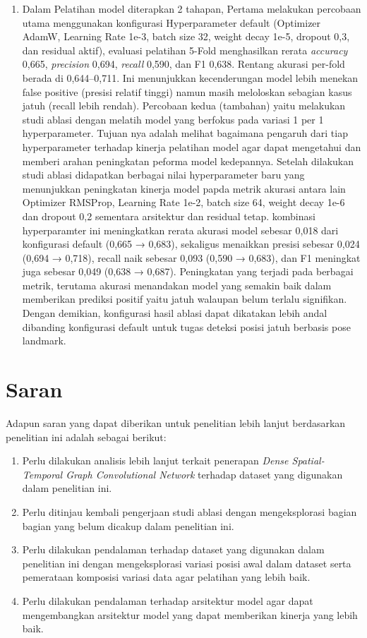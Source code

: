 \begin{enumerate}
    \item Dalam Pelatihan model diterapkan 2 tahapan, Pertama melakukan percobaan utama menggunakan konfigurasi Hyperparameter default (Optimizer AdamW, Learning Rate 1e-3, batch size 32, weight decay 1e-5, dropout 0,3, dan residual aktif), evaluasi pelatihan 5-Fold menghasilkan rerata \textit{accuracy} 0,665, \textit{precision} 0,694, \textit{recall} 0,590, dan F1 0,638. Rentang akurasi per-fold berada di 0,644–0,711. Ini menunjukkan kecenderungan model lebih menekan false positive (presisi relatif tinggi) namun masih meloloskan sebagian kasus jatuh (recall lebih rendah). Percobaan kedua (tambahan) yaitu melakukan studi ablasi dengan melatih model yang berfokus pada variasi 1 per 1 hyperparameter. Tujuan nya adalah melihat bagaimana pengaruh dari tiap hyperparameter terhadap kinerja pelatihan model agar dapat mengetahui dan memberi arahan peningkatan peforma model kedepannya. Setelah dilakukan studi ablasi didapatkan berbagai nilai hyperparameter baru yang menunjukkan peningkatan kinerja model papda metrik akurasi antara lain Optimizer RMSProp, Learning Rate 1e-2, batch size 64, weight decay 1e-6 dan dropout 0,2 sementara arsitektur dan residual tetap. kombinasi hyperparamter ini meningkatkan rerata akurasi model sebesar 0,018 dari konfigurasi default (0,665 → 0,683), sekaligus menaikkan presisi sebesar 0,024 (0,694 → 0,718), recall naik sebesar 0,093 (0,590 → 0,683), dan F1 meningkat juga sebesar 0,049 (0,638 → 0,687). Peningkatan yang terjadi pada berbagai metrik, terutama akurasi menandakan model yang semakin baik dalam memberikan prediksi positif yaitu jatuh walaupan belum terlalu signifikan. Dengan demikian, konfigurasi hasil ablasi dapat dikatakan lebih andal dibanding konfigurasi default untuk tugas deteksi posisi jatuh berbasis pose landmark.
\end{enumerate}


\section{Saran} \label{V.Saran}
Adapun saran yang dapat diberikan untuk penelitian lebih lanjut berdasarkan penelitian ini adalah sebagai berikut:\par
\begin{enumerate}
    \item Perlu dilakukan analisis lebih lanjut terkait penerapan \textit{Dense Spatial-Temporal Graph
Convolutional Network} terhadap dataset yang digunakan dalam penelitian ini.
    \item Perlu ditinjau kembali pengerjaan studi ablasi dengan mengeksplorasi bagian bagian yang belum dicakup dalam penelitian ini.
    \item Perlu dilakukan pendalaman terhadap dataset yang digunakan dalam penelitian ini dengan mengeksplorasi variasi posisi awal dalam dataset serta pemerataan komposisi variasi data agar pelatihan yang lebih baik.
    \item Perlu dilakukan pendalaman terhadap arsitektur model agar dapat mengembangkan arsitektur model yang dapat memberikan kinerja yang lebih baik.
\end{enumerate}